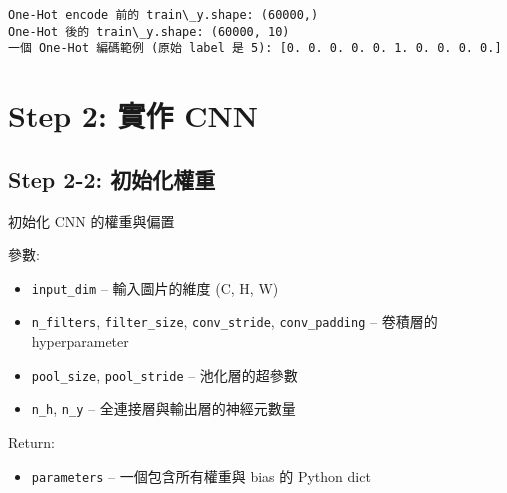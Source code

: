 \documentclass[11pt]{article}
\providecommand{\tightlist}{%
      \setlength{\itemsep}{0pt}\setlength{\parskip}{0pt}}
\begin{document}
    \begin{Verbatim}[commandchars=\\\{\}]
One-Hot encode 前的 train\_y.shape: (60000,)
One-Hot 後的 train\_y.shape: (60000, 10)
一個 One-Hot 編碼範例 (原始 label 是 5): [0. 0. 0. 0. 0. 1. 0. 0. 0. 0.]
    \end{Verbatim}

    \section{Step 2: 實作 CNN}\label{step-2-ux5be6ux4f5c-cnn}

    \subsection{Step 2-2:
初始化權重}\label{step-2-2-ux521dux59cbux5316ux6b0aux91cd}

初始化 CNN 的權重與偏置

參數:

\begin{itemize}
\tightlist
\item
  \texttt{input\_dim} -- 輸入圖片的維度 (C, H, W)
\item
  \texttt{n\_filters}, \texttt{filter\_size}, \texttt{conv\_stride},
  \texttt{conv\_padding} -- 卷積層的 hyperparameter
\item
  \texttt{pool\_size}, \texttt{pool\_stride} -- 池化層的超參數
\item
  \texttt{n\_h}, \texttt{n\_y} -- 全連接層與輸出層的神經元數量
\end{itemize}

Return:

\begin{itemize}
\tightlist
\item
  \texttt{parameters} -- 一個包含所有權重與 bias 的 Python dict
\end{itemize}
\end{document}
